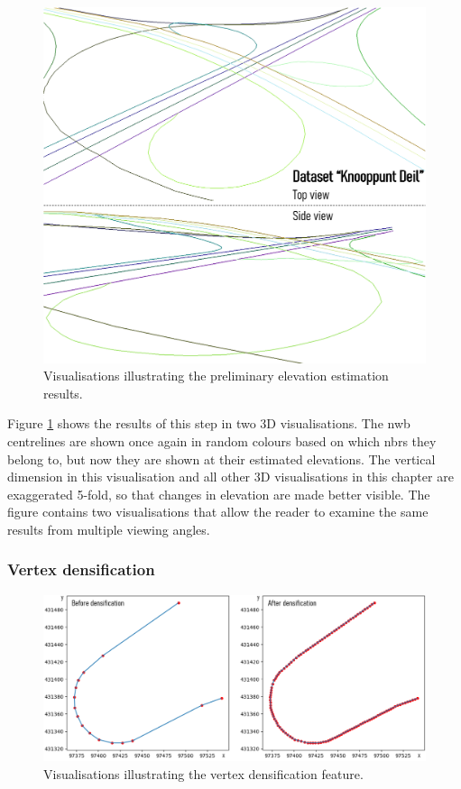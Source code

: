 \begin{figure}
    \centering
    \includegraphics[width=\linewidth]{final_report/figs/elevationestimation0.png}
    \caption{Visualisations illustrating the preliminary elevation estimation results.}
    \label{fig:elevationestimation0}
\end{figure}

Figure \ref{fig:elevationestimation0} shows the results of this step in two 3D visualisations. The \ac{nwb} centrelines are shown once again in random colours based on which \ac{nbrs} they belong to, but now they are shown at their estimated elevations. The vertical dimension in this visualisation and all other 3D visualisations in this chapter are exaggerated 5-fold, so that changes in elevation are made better visible. The figure contains two visualisations that allow the reader to examine the same results from multiple viewing angles.

\subsubsection{Vertex densification}

\begin{figure}
    \centering
    \includegraphics[width=\linewidth]{final_report/figs/elevationestimation1.png}
    \caption{Visualisations illustrating the vertex densification feature.}
    \label{fig:elevationestimation1}
\end{figure}

